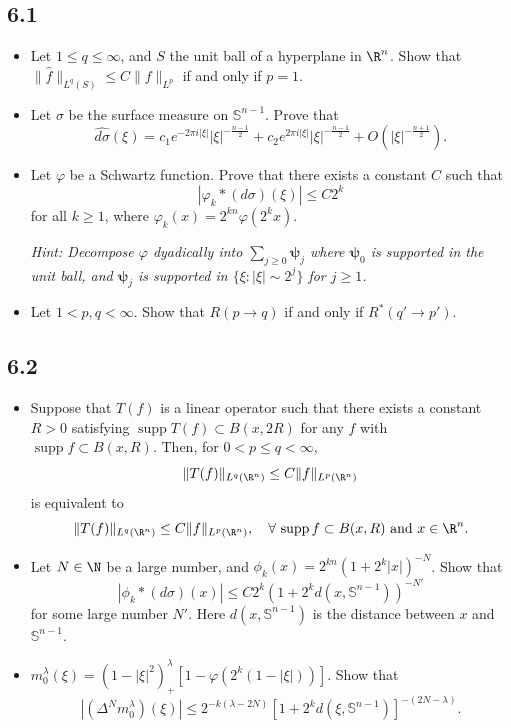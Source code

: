 \subsection*{6.1}
\begin{itemize}
    \item[1.]Let $1\le q\le\infty$, and $S$ the unit ball of a hyperplane in $\R^n$.
    Show that $\|\hat{f}\|_{L^q(S)}\le C\|f\|_{L^p}$ if and only if $p=1$.

    \item[2.]Let $\sigma$ be the surface measure on $\mathbb{S}^{n-1}$. Prove that
    $$\widehat{d\sigma}(\xi)=c_1e^{-2\pi i|\xi|}|\xi|^{-\frac{n-1}{2}}
    +c_2e^{2\pi i|\xi|}|\xi|^{-\frac{n-1}{2}}+O(|\xi|^{-\frac{n+1}{2}}).$$

    \item[3.]Let $\varphi$ be a Schwartz function. 
    Prove that there exists a constant $C$ such that
    $$|\varphi_k*(d\sigma)(\xi)|\le C2^k$$
    for all $k\ge1$, where $\varphi_k(x)=2^{kn}\varphi(2^kx)$.

    \textit{Hint: Decompose $\varphi$ dyadically into 
    $\sum_{j\ge0}\boldsymbol{\psi}_j$ 
    where $\boldsymbol{\psi}_0$ is supported in the unit ball, 
    and $\boldsymbol{\psi}_j$ is supported 
    in $\{\xi:|\xi|\sim2^j\}$ for $j\ge1$.}
    
    \item[4.]Let $1<p,q<\infty$. Show that $R(p\to q)$ if and only if $R^*(q'\to p')$.
\end{itemize}

\subsection*{6.2}
\begin{itemize}
    \item[1.]Suppose that $T(f)$ is a linear operator such that there exists 
    a constant $R>0$ satisfying $\operatorname{supp}T(f)\subset B(x,2R)$ for any 
    $f$ with $\operatorname{supp}f\subset B(x,R)$. Then, for $0<p\le q<\infty$, 
    $$\|T(f)\|_{L^q(\R^n)}\le C\|f\|_{L^p(\R^n)}$$
    is equivalent to
    $$\|T(f)\|_{L^q(\R^n)}\le C\|f\|_{L^p(\R^n)},
    \quad\forall\,\operatorname{supp}f\subset B(x,R)\text{ and }x\in\R^n.$$

    \item[2.]Let $N\in\N$ be a large number, and $\phi_k(x)=2^{kn}(1+2^k|x|)^{-N}$. 
    Show that
    $$|\phi_k*(d\sigma)(x)|\le C2^k(1+2^kd(x,\mathbb{S}^{n-1}))^{-N'}$$
    for some large number $N'$. Here $d(x,\mathbb{S}^{n-1})$ is the distance 
    between $x$ and $\mathbb{S}^{n-1}$.

    \item[3.]$m_0^\lambda(\xi)=(1-|\xi|^2)^\lambda_+[1-\varphi(2^k(1-|\xi|))]$. 
    Show that
    $$|(\Delta^Nm_0^\lambda)(\xi)|
    \le2^{-k(\lambda-2N)}[1+2^kd(\xi,\mathbb{S}^{n-1})]^{-(2N-\lambda)}.$$
    
\end{itemize}

